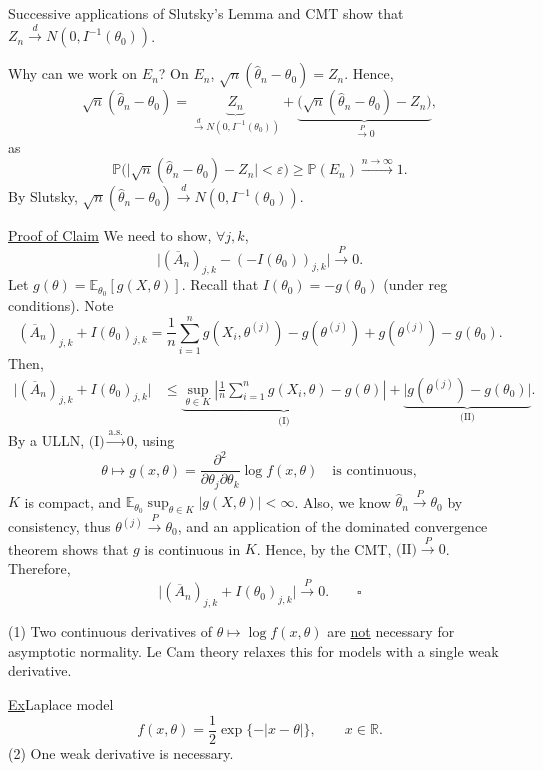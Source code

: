 \documentclass[11pt,a4paper]{article}
\begin{document}
Successive applications of Slutsky's Lemma and CMT show that
$Z_n\xrightarrow{d}N(0,I^{-1}(\theta_0))$.

Why can we work on $E_n$? On $E_n$,
$\sqrt{n}(\hat{\theta}_n-\theta_0)=Z_n$. Hence,
\[
\sqrt{n}(\hat{\theta}_n-\theta_0)
=\underbrace{Z_n}_{\xrightarrow{d}N(0,I^{-1}(\theta_0))}
+\underbrace{\bigl(\sqrt{n}(\hat{\theta}_n-\theta_0)-Z_n\bigr)}
_{\xrightarrow{P}0},
\]
as
\[
\mathbb{P}\bigl(\lvert\sqrt{n}(\hat{\theta}_n-\theta_0)-Z_n\rvert<\varepsilon\bigr)
\geq\mathbb{P}(E_n)\xrightarrow{n\to\infty}1.
\]
By Slutsky,
$\sqrt{n}(\hat{\theta}_n-\theta_0)\xrightarrow{d}N(0,I^{-1}(\theta_0))$.

\medskip
\noindent\underline{Proof of Claim}\quad
We need to show, $\forall j,k$,
\[
\lvert(\overline{A}_n)_{j,k}-(-I(\theta_0))_{j,k}\rvert\xrightarrow{P}0.
\]
Let $g(\theta)=\mathbb{E}_{\theta_0}[g(X,\theta)]$.
Recall that $I(\theta_0)=-g(\theta_0)$ (under reg conditions).
Note
\[
(\overline{A}_n)_{j,k}+I(\theta_0)_{j,k}
=\frac1n\sum_{i=1}^n g(X_i,\theta^{(j)})-g(\theta^{(j)})
+g(\theta^{(j)})-g(\theta_0).
\]
Then,
\[
\begin{aligned}
\lvert(\overline{A}_n)_{j,k}+I(\theta_0)_{j,k}\rvert
&\leq\underbrace{\sup_{\theta\in K}
\left\lvert\frac1n\sum_{i=1}^n g(X_i,\theta)-g(\theta)\right\rvert}_{\text{(I)}}
+\underbrace{\lvert g(\theta^{(j)})-g(\theta_0)\rvert}_{\text{(II)}}.
\end{aligned}
\]
By a ULLN, $\text{(I)}\xrightarrow{\mathrm{a.s.}}0$, using
\[
\theta\longmapsto g(x,\theta)
=\frac{\partial^2}{\partial\theta_j\partial\theta_k}\log f(x,\theta)
\quad\text{is continuous},
\]
$K$ is compact, and
$\mathbb{E}_{\theta_0}\sup_{\theta\in K}|g(X,\theta)|<\infty$.
Also, we know $\hat{\theta}_n\xrightarrow{P}\theta_0$ by consistency,
thus $\theta^{(j)}\xrightarrow{P}\theta_0$, and an application of the
dominated convergence theorem shows that $g$ is continuous in $K$.
Hence, by the CMT,
$\text{(II)}\xrightarrow{P}0$.
Therefore,
\[
\lvert(\overline{A}_n)_{j,k}+I(\theta_0)_{j,k}\rvert\xrightarrow{P}0.
\qquad\square
\]

\noindent (1) Two continuous derivatives of
$\theta\mapsto\log f(x,\theta)$ are \underline{not} necessary for asymptotic normality.
Le Cam theory relaxes this for models with a single weak derivative.

\medskip
\noindent\underline{Ex}\quad Laplace model
\[
f(x,\theta)=\frac12\exp\{-|x-\theta|\},\qquad x\in\mathbb{R}.
\]
\noindent (2) One weak derivative is necessary.
\end{document}
